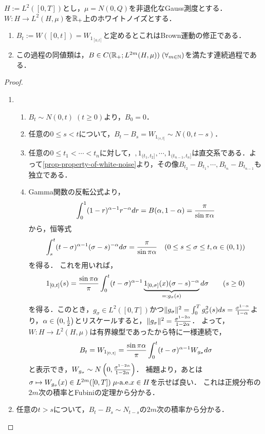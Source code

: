 \documentclass[uplatex,dvipdfmx]{jsreport}
\begin{document}
\begin{proposition}
    $H:=L^2([0,T])$とし，$\mu=N(0,Q)$を非退化なGauss測度とする．
    $W:H\to L^2(H,\mu)$を$\mathbb{R}_+$上のホワイトノイズとする．
    \begin{enumerate}
        \item $B_t:=W([0,t])=W_{1_{[0,t]}}$と定めるとこれはBrown運動の修正である．
        \item この過程の同値類は，$B\in C(\mathbb{R}_+;L^{2m}(H,\mu))\;(\forall_{m\in\mathbb{N}})$を満たす連続過程である．
    \end{enumerate}
\end{proposition}
\begin{proof}\mbox{}
    \begin{enumerate}
        \item \begin{enumerate}[({B}1)]
            \item $B_t\sim N(0,t)\;(t\ge0)$より，$B_0=0$．
            \item 任意の$0\le s<t$について，$B_t-B_s=W_{1_{(s,t]}}\sim N(0,t-s)$．
            \item 任意の$0\le t_1<\cdots<t_n$に対して，$,1_{(t_1,t_2]},\cdots,1_{(t_{n-1},t_n]}$は直交系である．よって\ref{prop-property-of-white-noise}より，その像$B_{t_2}-B_{t_1},\cdots,B_{t_n}-B_{t_{n-1}}$も独立である．
            \item Gamma関数の反転公式より，
            \[\int^1_0(1-r)^{\alpha-1}r^{-\alpha}dr=B(\alpha,1-\alpha)=\frac{\pi}{\sin\pi\alpha}\]
            から，恒等式
            \[\int^t_s(t-\sigma)^{\alpha-1}(\sigma-s)^{-\alpha}d\sigma=\frac{\pi}{\sin\pi\alpha}\quad(0\le s\le\sigma\le t,\alpha\in(0,1))\]
            を得る．
            これを用いれば，
            \[1_{[0,t]}(s)=\frac{\sin\pi\alpha}{\pi}\int^t_0(t-\sigma)^{\alpha-1}\underbrace{1_{[0,\sigma]}(x)(\sigma-s)^{-\alpha}}_{=:g_\sigma(s)}d\sigma\qquad(s\ge0)\]
            を得る．このとき，$g_\sigma\in L^2([0,T])$かつ$\|g_\sigma\|^2=\int^T_0g_\sigma^2(s)ds=\frac{\sigma^{1-\alpha}}{1-\alpha}$より，$\alpha\in\left(0,\frac{1}{2}\right)$とリスケールすると，$\|g_\sigma\|^2=\frac{\sigma^{1-2\alpha}}{1-2\alpha}$．
            よって，$W:H\to L^2(H,\mu)$は有界線型であったから特に一様連続で，
            \[B_t=W_{1_{[0,t]}}=\frac{\sin\pi\alpha}{\pi}\int^t_0(t-\sigma)^{\alpha-1}W_{g_\sigma}d\sigma\]
            と表示でき，$W_{g_\sigma}\sim N\left(0,\frac{\sigma^{1-2\alpha}}{1-2\alpha}\right)$．
            補題より，あとは$\sigma\mapsto W_{g_\sigma}(x)\in L^{2m}([0,T])\;\mu\text{-a.e.} x\in H$を示せば良い．
            これは正規分布の$2m$次の積率とFubiniの定理から分かる．
        \end{enumerate}
        \item 任意の$t>s$について，$B_t-B_s\sim N_{t-s}$の$2m$次の積率から分かる．
    \end{enumerate}
\end{proof}
\end{document}

